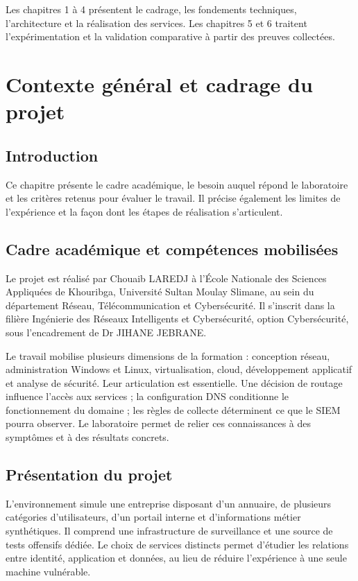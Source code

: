 \documentclass[a4paper,12pt]{report}
\begin{document}
Les chapitres 1 à 4 présentent le cadrage, les fondements techniques, l'architecture et la réalisation des services. Les chapitres 5 et 6 traitent l'expérimentation et la validation comparative à partir des preuves collectées.
\chapter{Contexte général et cadrage du projet}
\section*{Introduction}
Ce chapitre présente le cadre académique, le besoin auquel répond le laboratoire et les critères retenus pour évaluer le travail. Il précise également les limites de l'expérience et la façon dont les étapes de réalisation s'articulent.

\section{Cadre académique et compétences mobilisées}
Le projet est réalisé par Chouaib LAREDJ à l'École Nationale des Sciences Appliquées de Khouribga, Université Sultan Moulay Slimane, au sein du département Réseau, Télécommunication et Cybersécurité. Il s'inscrit dans la filière Ingénierie des Réseaux Intelligents et Cybersécurité, option Cybersécurité, sous l'encadrement de Dr JIHANE JEBRANE.

Le travail mobilise plusieurs dimensions de la formation : conception réseau, administration Windows et Linux, virtualisation, cloud, développement applicatif et analyse de sécurité. Leur articulation est essentielle. Une décision de routage influence l'accès aux services ; la configuration DNS conditionne le fonctionnement du domaine ; les règles de collecte déterminent ce que le SIEM pourra observer. Le laboratoire permet de relier ces connaissances à des symptômes et à des résultats concrets.

\section{Présentation du projet}
L'environnement simule une entreprise disposant d'un annuaire, de plusieurs catégories d'utilisateurs, d'un portail interne et d'informations métier synthétiques. Il comprend une infrastructure de surveillance et une source de tests offensifs dédiée. Le choix de services distincts permet d'étudier les relations entre identité, application et données, au lieu de réduire l'expérience à une seule machine vulnérable.
\end{document}
